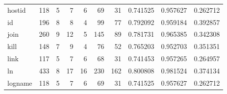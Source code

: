 \begin{tabular}{lrrrrrrrrr}
hostid    &                    118 &                                  5 &                                 7 &                                6 &                                69 &                              31 &                                0.741525 &                               0.957627 &                             0.262712 \\
id        &                    196 &                                  8 &                                 8 &                                4 &                                99 &                              77 &                                0.792092 &                               0.959184 &                             0.392857 \\
join      &                    260 &                                  9 &                                12 &                                5 &                               145 &                              89 &                                0.781731 &                               0.965385 &                             0.342308 \\
kill      &                    148 &                                  7 &                                 9 &                                4 &                                76 &                              52 &                                0.765203 &                               0.952703 &                             0.351351 \\
link      &                    117 &                                  5 &                                 7 &                                6 &                                68 &                              31 &                                0.741453 &                               0.957265 &                             0.264957 \\
ln        &                    433 &                                  8 &                                17 &                               16 &                               230 &                             162 &                                0.800808 &                               0.981524 &                             0.374134 \\
logname   &                    118 &                                  5 &                                 7 &                                6 &                                69 &                              31 &                                0.741525 &                               0.957627 &                             0.262712 \\

\end{tabular}
